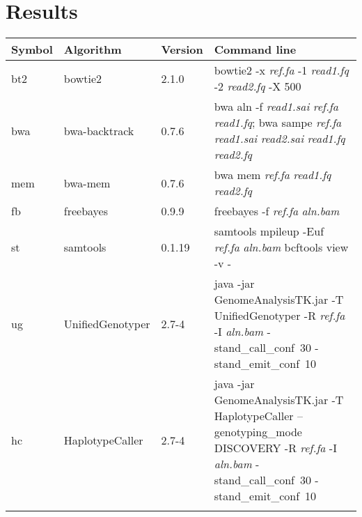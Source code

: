\documentclass{bioinfo}
\begin{document}

\title{}

\author[Li]{Heng Li}

\address{Broad Institute of Harvard and MIT, 7 Cambridge Center, Cambridge, MA 02142, USA}

\maketitle

\begin{abstract}
\end{abstract}

\section{Results}

\begin{table*}
\footnotesize
{}
{\begin{tabular*}{\textwidth}{@{\extracolsep{\fill}}lllp{12cm}}
\toprule
Symbol & Algorithm & Version & Command line \\
\midrule
bt2 & bowtie2 & 2.1.0 & bowtie2 -x \emph{ref.fa} -1 \emph{read1.fq} -2 \emph{read2.fq} -X 500 \\
bwa & bwa-backtrack & 0.7.6 & bwa aln -f \emph{read1.sai} \emph{ref.fa} \emph{read1.fq}; bwa sampe \emph{ref.fa} \emph{read1.sai} \emph{read2.sai} \emph{read1.fq} \emph{read2.fq} \\
mem & bwa-mem & 0.7.6 & bwa mem \emph{ref.fa} \emph{read1.fq} \emph{read2.fq} \\
fb & freebayes & 0.9.9 & freebayes -f \emph{ref.fa} \emph{aln.bam} \\
st & samtools & 0.1.19 & samtools mpileup -Euf \emph{ref.fa} \emph{aln.bam} {\tt \char124} bcftools view -v - \\
ug & UnifiedGenotyper & 2.7-4 & java -jar GenomeAnalysisTK.jar -T UnifiedGenotyper -R \emph{ref.fa} -I \emph{aln.bam} \mbox{-stand\_call\_conf 30} \mbox{-stand\_emit\_conf 10} \\
hc & HaplotypeCaller & 2.7-4 & java -jar GenomeAnalysisTK.jar -T HaplotypeCaller --genotyping\_mode DISCOVERY -R \emph{ref.fa} -I \emph{aln.bam} \mbox{-stand\_call\_conf 30} \mbox{-stand\_emit\_conf 10} \\
\botrule
\end{tabular*}}{}
\end{table*}
\end{document}
